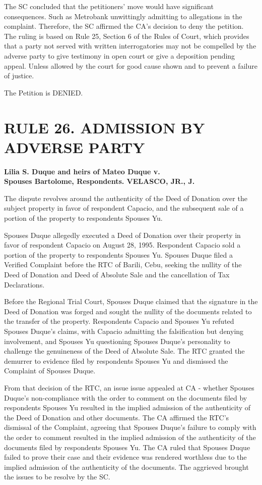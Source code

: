 \documentclass[
12pt,
oneside,
onehalfspacing,
headsepline
]{DigestCollection}
\begin{document}
The SC concluded that the petitioners' move would have significant consequences. Such as Metrobank unwittingly admitting to allegations in the complaint. Therefore, the SC affirmed the CA's decision to deny the petition. The ruling is based on Rule 25, Section 6 of the Rules of Court, which provides that a party not served with written interrogatories may not be compelled by the adverse party to give testimony in open court or give a deposition pending appeal. Unless allowed by the court for good cause shown and to prevent a failure of justice.

The Petition is DENIED. 

\chapter{RULE 26. ADMISSION BY ADVERSE PARTY}
\label{2560ec20-0a13-11ef-932c-63c852f65e48}


\label{2b3c2090-0a10-11ef-932c-63c852f65e48}


\noindent\textbf{Lilia S. Duque and heirs of Mateo Duque v. \\Spouses Bartolome, Respondents. VELASCO, JR., J.}\vspace{0.4cm}

The dispute revolves around the authenticity of the Deed of Donation over the subject property in favor of respondent Capacio, and the subsequent sale of a portion of the property to respondents Spouses Yu.

Spouses Duque allegedly executed a Deed of Donation over their property in favor of respondent Capacio on August 28, 1995. Respondent Capacio sold a portion of the property to respondents Spouses Yu. Spouses Duque filed a Verified Complaint before the RTC of Barili, Cebu, seeking the nullity of the Deed of Donation and Deed of Absolute Sale and the cancellation of Tax Declarations.

Before the Regional Trial Court, Spouses Duque claimed that the signature in the Deed of Donation was forged and sought the nullity of the documents related to the transfer of the property. Respondents Capacio and Spouses Yu refuted Spouses Duque's claims, with Capacio admitting the falsification but denying involvement, and Spouses Yu questioning Spouses Duque's personality to challenge the genuineness of the Deed of Absolute Sale. The RTC granted the demurrer to evidence filed by respondents Spouses Yu and dismissed the Complaint of Spouses Duque.

From that decision of the RTC, an issue issue appealed at CA - whether Spouses Duque's non-compliance with the order to comment on the documents filed by respondents Spouses Yu resulted in the implied admission of the authenticity of the Deed of Donation and other documents. The CA affirmed the RTC's dismissal of the Complaint, agreeing that Spouses Duque's failure to comply with the order to comment resulted in the implied admission of the authenticity of the documents filed by respondents Spouses Yu. The CA ruled that Spouses Duque failed to prove their case and their evidence was rendered worthless due to the implied admission of the authenticity of the documents. The aggrieved brought the issues to be resolve by the SC.
\end{document}
